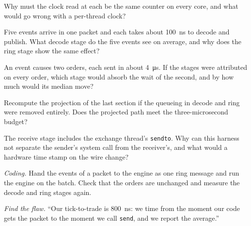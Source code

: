 \begin{exercise}[$\star$]\label{exo:ll:build-tick-to-trade-measured:2}
Why must the clock read at each  be the same counter on every core, and what would go wrong with a
per-thread clock?
\end{exercise}

\begin{exercise}[$\star$]\label{exo:ll:build-tick-to-trade-measured:3}
Five events arrive in one packet and each takes about \qty{100}{\nano\second} to decode and publish. What decode stage do the
five events see on average, and why does the ring stage show the same effect?
\end{exercise}

\begin{exercise}[$\star\star$]\label{exo:ll:build-tick-to-trade-measured:4}
An event causes two orders, each sent in about \qty{4}{\micro\second}. If the stages were attributed on every order, which stage
would absorb the wait of the second, and by how much would its median move?
\end{exercise}

\begin{exercise}[$\star\star$]\label{exo:ll:build-tick-to-trade-measured:5}
Recompute the projection of the last section if the queueing in decode and ring were removed entirely. Does the projected path
meet the three-microsecond budget?
\end{exercise}

\begin{exercise}[$\star\star$]\label{exo:ll:build-tick-to-trade-measured:6}
The receive stage includes the exchange thread's \texttt{sendto}. Why can this harness not separate the sender's system call from
the receiver's, and what would a hardware time stamp on the wire change?
\end{exercise}

\begin{exercise}[$\star\star\star$]\label{exo:ll:build-tick-to-trade-measured:7}
\emph{Coding.} Hand the events of a packet to the engine as one ring message and run the engine on the batch. Check that the
orders are unchanged and measure the decode and ring stages again.
\end{exercise}

\begin{exercise}[$\star\star\star$]\label{exo:ll:build-tick-to-trade-measured:8}
\emph{Find the flaw.} ``Our tick-to-trade is \qty{800}{\nano\second}: we time from the moment our code gets the packet to the
moment we call \texttt{send}, and we report the average.''
\end{exercise}

